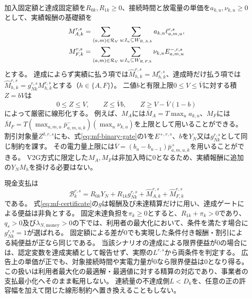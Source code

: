 加入固定額と達成固定額を$R_{0k},R_{1k}\ge0$、接続時間と放電量の単価を$a_{k,u},\nu_{k,u}\ge0$として、実績報酬の基礎額を
\begin{align}
 M_{A,k}^{r,s}
 &=\sum_{(a,m)\in\mathcal R_V}\sum_{u:I_u\subseteq W_{R,A,k}}
 a_{k,u}\ell_{a,m,u}^{r,s},\notag\\
 M_{F,k}^{r,s}
 &=\sum_{(a,m)\in\mathcal R_V}\sum_{u:I_u\subseteq W_{R,F,k}}
 \nu_{k,u}E_{a,m,u}^{-,r,s}
 \label{eq:mf-unit-reward}
\end{align}
とする。
達成によらず実績に払う項では$\widehat M_{h,k}^{r,s}=M_{h,k}^{r,s}$、達成時だけ払う項では$\widehat M_{h,k}^{r,s}=g_{Nk}^{r,s}M_{h,k}^{r,s}$とする（$h\in\{A,F\}$）。
二値$b$と有限上限$0\le V\le\overline V$に対する積$Z=bV$は
\begin{equation}
 0\le Z\le V,\qquad Z\le\overline V b,\qquad
 Z\ge V-\overline V(1-b)
 \label{eq:mf-binary-gate}
\end{equation}
によって厳密に線形化する。
例えば、$M_A$には$\overline M_A=T\max_u a_{k,u}$、$M_F$には$\overline M_F=T(\max_{a,m,u}\bar p_{a,m,u,k}^-)(\max_u\nu_{k,u})$を上限として用いることができる。
割引対象量$Z^{\delta,r,s}$にも、式\eqref{eq:mf-binary-gate}の$V$を$E^{+,r,s}$、$b$を$Y_N$又は$g_{Nk}^{r,s}$として同じ制約を課す。
その電力量上限には$\overline V=(b_u-b_{u-1})\bar p_{a,m,u,k}^+$を用いることができる。
V2G方式に限定した$M_A,M_F$は非加入時に0となるため、実績報酬に追加の$Y_NM_h$を掛ける必要はない。

現金支払は
\begin{equation}
 \mathcal B_k^{r,s}=R_{0k}Y_N+R_{1k}g_{Nk}^{r,s}
   +\widehat M_{A,k}^{r,s}+\widehat M_{F,k}^{r,s}
 \label{eq:mf-cash-payment}
\end{equation}
である。
式\eqref{eq:mf-certificate}の$g$は報酬及び未達精算だけに用い、達成ゲートによる便益は非負とする。
固定未達負担を$\pi_k\ge0$とすると、$R_{1k}+\pi_k>0$であり、$q_s>0$及び$\lambda_{N,\mathrm{money}}>0$の下では、利用者の最大化において、条件を満たす場合に$g_{Nk}^{r,s}=1$が選ばれる。
固定額による差が0でも実現した条件付き報酬・割引による純便益が正なら同じである。
当該シナリオの達成による限界便益が0の場合には、認定変数を達成実績として報告せず、実際の$L^{r,s}$から両条件を判定する。
広告上の単価が正でも、対象接続時間や実電力量が0なら限界便益は0となり得る。
この扱いは利用者最大化の最適解・最適値に対する精算の対応であり、事業者の支払最小化へそのまま転用しない。
連続量の不達成側$L<D_k$を、任意の正の許容幅を加えて閉じた線形制約へ置き換えることもしない。

